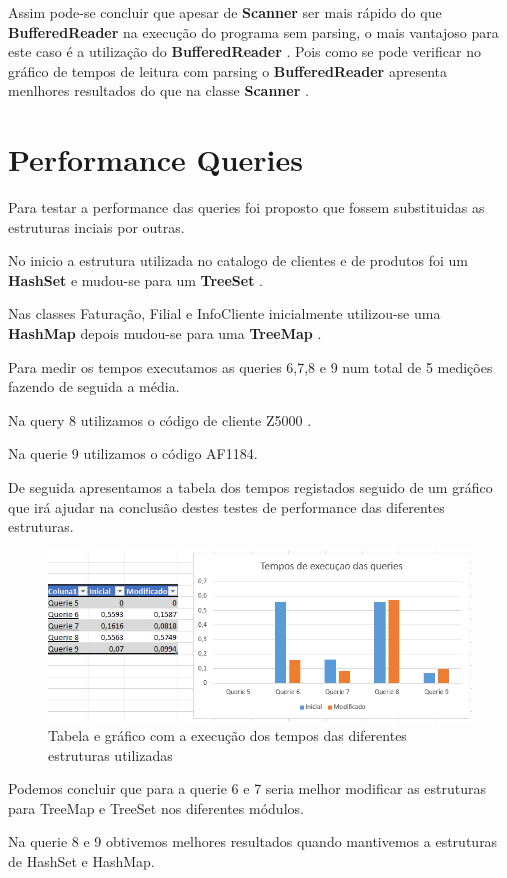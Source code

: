 \par Assim pode-se concluir que apesar de \color{blue} \textbf{Scanner} \color{black} ser mais rápido do que  \color{blue} \textbf{BufferedReader} \color{black} na execução do programa sem parsing, o mais vantajoso para este caso é a utilização do \color{blue} \textbf{BufferedReader} \color{black}. Pois como se pode verificar no gráfico de tempos de leitura com parsing o  \color{blue} \textbf{BufferedReader} \color{black} apresenta menlhores resultados do que na classe \color{blue} \textbf{Scanner} \color{black}. 


\section{Performance Queries }
Para testar a performance das queries foi proposto que fossem substituidas as estruturas inciais por outras. 


No inicio a estrutura utilizada no catalogo de clientes e de produtos foi um \color{blue} \textbf{HashSet} \color{black} e mudou-se para um \color{blue} \textbf{TreeSet} \color{black}.



Nas classes Faturação, Filial e InfoCliente inicialmente utilizou-se uma  \color{blue} \textbf{HashMap} \color{black}  depois mudou-se para uma \color{blue} \textbf{TreeMap} \color{black}. 

Para medir os tempos executamos as queries 6,7,8 e 9 num total de 5 medições fazendo de seguida a média.


Na query 8 utilizamos o código de cliente Z5000 . 

Na querie 9 utilizamos o código AF1184. 

\newpage

\par De seguida apresentamos a tabela dos tempos registados seguido de um gráfico que irá ajudar na conclusão destes testes de performance das diferentes estruturas.

\begin{figure}[h!]
	\includegraphics[scale=0.8]{graficoqueries}  
	\caption{Tabela e gráfico com a execução dos tempos das diferentes estruturas utilizadas }  
\end{figure}

Podemos concluir que para a querie 6 e 7 seria melhor modificar as estruturas para  TreeMap e TreeSet nos diferentes módulos. 

Na querie 8 e 9 obtivemos melhores resultados quando mantivemos a estruturas de HashSet e HashMap.  
  	